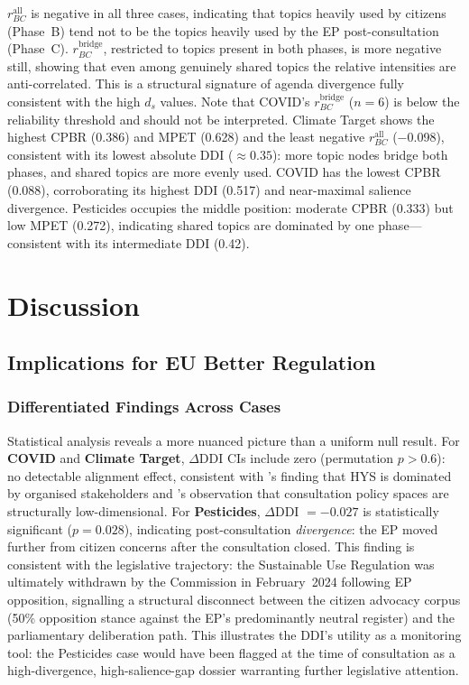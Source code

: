 \documentclass[sigconf,natbib]{acmart}
\begin{document}
\noindent
$r_{BC}^{\text{all}}$ is negative in all three cases, indicating that topics heavily used by
citizens (Phase~B) tend not to be the topics heavily used by the EP post-consultation (Phase~C).
$r_{BC}^{\text{bridge}}$, restricted to topics present in both phases, is more negative still,
showing that even among genuinely shared topics the relative intensities are anti-correlated.
This is a structural signature of agenda divergence fully consistent with the high $d_s$ values.
Note that COVID's $r_{BC}^{\text{bridge}}$ ($n=6$) is below the reliability threshold and should
not be interpreted.
Climate Target shows the highest CPBR (0.386) and MPET (0.628) and the least negative
$r_{BC}^{\text{all}}$ ($-$0.098), consistent with its lowest absolute DDI ($\approx 0.35$): more
topic nodes bridge both phases, and shared topics are more evenly used. COVID has the lowest
CPBR (0.088), corroborating its highest DDI (0.517) and near-maximal salience divergence.
Pesticides occupies the middle position: moderate CPBR (0.333) but low MPET (0.272),
indicating shared topics are dominated by one phase---consistent with its intermediate DDI (0.42).

\section{Discussion}

\subsection{Implications for EU Better Regulation}

\subsubsection{Differentiated Findings Across Cases}
Statistical analysis reveals a more nuanced picture than a uniform null result.
For \textbf{COVID} and \textbf{Climate Target}, $\Delta$DDI CIs include zero (permutation $p > 0.6$):
no detectable alignment effect, consistent with \citet{Neumann2025}'s finding that
HYS is dominated by organised stakeholders and \citet{Bunea2024}'s observation that
consultation policy spaces are structurally low-dimensional.
For \textbf{Pesticides}, $\Delta$DDI $= -0.027$ is statistically significant ($p = 0.028$),
indicating post-consultation \emph{divergence}: the EP moved further from citizen concerns
after the consultation closed. This finding is consistent with the legislative trajectory:
the Sustainable Use Regulation was ultimately withdrawn by the Commission in February~2024
following EP opposition, signalling a structural disconnect between the citizen
advocacy corpus (50\% opposition stance against the EP's predominantly neutral register)
and the parliamentary deliberation path.
This illustrates the DDI's utility as a monitoring tool: the Pesticides case would
have been flagged at the time of consultation as a high-divergence, high-salience-gap
dossier warranting further legislative attention.
\end{document}
